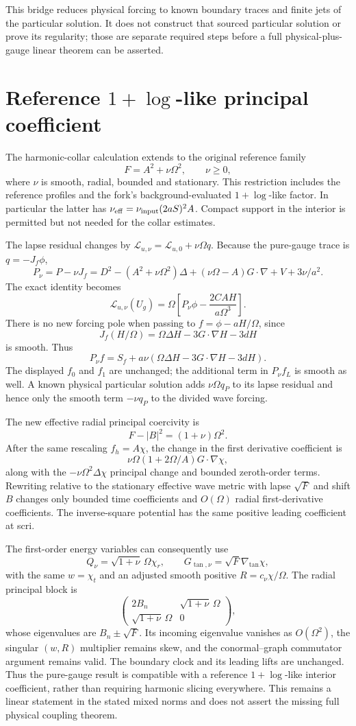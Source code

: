 \documentclass[11pt]{article}
\begin{document}
This bridge reduces physical forcing to known boundary traces and finite jets of the particular solution. It does not construct that sourced particular solution or prove its regularity; those are separate required steps before a full physical-plus-gauge linear theorem can be asserted.
\section{Reference $1+\log$-like principal coefficient}
The harmonic-collar calculation extends to the original reference family
\[
 F=A^2+\nu\Omega^2,\qquad \nu\ge0,
\]
where $\nu$ is smooth, radial, bounded and stationary. This restriction includes the reference profiles and the fork's background-evaluated $1+\log$-like factor. In particular the latter has $\nu_{\rm eff}=\nu_{\rm input}(2aS)^2A$. Compact support in the interior is permitted but not needed for the collar estimates.

The lapse residual changes by $\mathcal L_{u,\nu}=\mathcal L_{u,0}+\nu\Omega q$. Because the pure-gauge trace is $q=-J_f\phi$,
\[
 P_\nu=P-\nu J_f
 =D^2-(A^2+\nu\Omega^2)\Delta
 +(\nu\Omega-A)G\cdot\nabla+V+3\nu/a^2.
\]
The exact identity becomes
\[
 \mathcal L_{u,\nu}(U_g)
 =\Omega\left[P_\nu\phi-\frac{2CAH}{a\Omega^3}\right].
\]
There is no new forcing pole when passing to $f=\phi-aH/\Omega$, since
\[
 J_f(H/\Omega)=\Omega\Delta H-3G\cdot\nabla H-3dH
\]
is smooth. Thus
\[
 P_\nu f=S_f+a\nu(\Omega\Delta H-3G\cdot\nabla H-3dH).
\]
The displayed $f_0$ and $f_1$ are unchanged; the additional term in $P_\nu f_L$ is smooth as well. A known physical particular solution adds $\nu\Omega q_P$ to its lapse residual and hence only the smooth term $-\nu q_P$ to the divided wave forcing.

The new effective radial principal coercivity is
\[
 F-|B|^2=(1+\nu)\Omega^2.
\]
After the same rescaling $f_h=A\chi$, the change in the first derivative coefficient is
\[
 \nu\Omega(1+2\Omega/A)G\cdot\nabla\chi,
\]
along with the $-\nu\Omega^2\Delta\chi$ principal change and bounded zeroth-order terms. Rewriting relative to the stationary effective wave metric with lapse $\sqrt F$ and shift $B$ changes only bounded time coefficients and $O(\Omega)$ radial first-derivative coefficients. The inverse-square potential has the same positive leading coefficient at scri.

The first-order energy variables can consequently use
\[
 Q_\nu=\sqrt{1+\nu}\,\Omega\chi_r,
 \qquad G_{\tan,\nu}=\sqrt F\nabla_{\tan}\chi,
\]
with the same $w=\chi_t$ and an adjusted smooth positive $R=c_\nu\chi/\Omega$. The radial principal block is
\[
 \begin{pmatrix}2B_n&\sqrt{1+\nu}\,\Omega\\
 \sqrt{1+\nu}\,\Omega&0\end{pmatrix},
\]
whose eigenvalues are $B_n\pm\sqrt F$. Its incoming eigenvalue vanishes as $O(\Omega^2)$, the singular $(w,R)$ multiplier remains skew, and the conormal--graph commutator argument remains valid. The boundary clock and its leading lifts are unchanged. Thus the pure-gauge result is compatible with a reference $1+\log$-like interior coefficient, rather than requiring harmonic slicing everywhere. This remains a linear statement in the stated mixed norms and does not assert the missing full physical coupling theorem.
\end{document}
